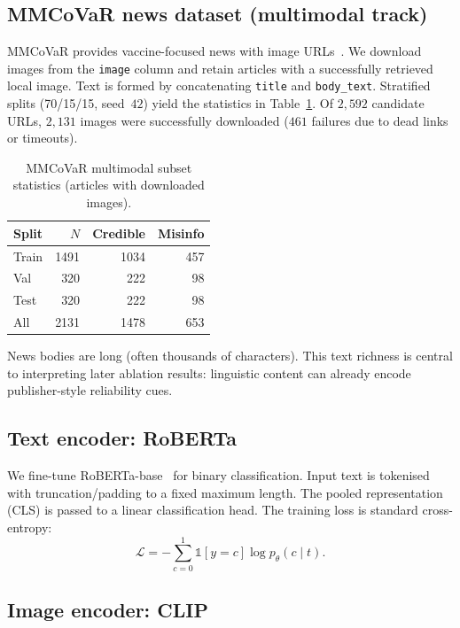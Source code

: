 \documentclass[12pt, a4paper]{report}
\begin{document}
\subsection{MMCoVaR news dataset (multimodal track)}

MMCoVaR provides vaccine-focused news with image URLs~\cite{chen2021mmcovar}.
We download images from the \texttt{image} column and retain articles with a successfully retrieved local image.
Text is formed by concatenating \texttt{title} and \texttt{body\_text}.
Stratified splits (70/15/15, seed~$42$) yield the statistics in Table~\ref{tab:mmcovar-stats}.
Of $2{,}592$ candidate URLs, $2{,}131$ images were successfully downloaded ($461$ failures due to dead links or timeouts).

\begin{table}[htbp]
\centering
\caption{MMCoVaR multimodal subset statistics (articles with downloaded images).}
\label{tab:mmcovar-stats}
\begin{tabular}{lrrr}
\hline
Split & $N$ & Credible & Misinfo \\
\hline
Train & 1491 & 1034 & 457 \\
Val   & 320 & 222 & 98 \\
Test  & 320 & 222 & 98 \\
\hline
All   & 2131 & 1478 & 653 \\
\hline
\end{tabular}
\end{table}

News bodies are long (often thousands of characters).
This text richness is central to interpreting later ablation results: linguistic content can already encode publisher-style reliability cues.

\subsection{Text encoder: RoBERTa}

We fine-tune RoBERTa-base~\cite{liu2019roberta} for binary classification.
Input text is tokenised with truncation/padding to a fixed maximum length.
The pooled representation (CLS) is passed to a linear classification head.
The training loss is standard cross-entropy:
\begin{equation}
\mathcal{L} = -\sum_{c=0}^{1} \mathbb{1}[y=c]\log p_\theta(c\mid t).
\end{equation}

\subsection{Image encoder: CLIP}
\end{document}
